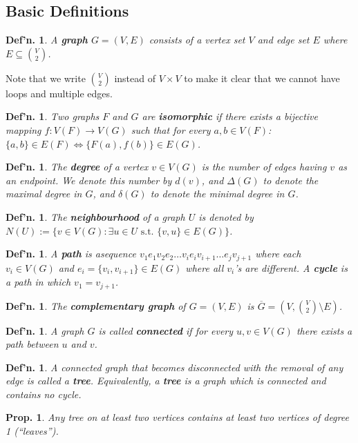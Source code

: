 \documentclass[12pt, a4paper]{book}
\newtheorem{definition}[theorem]{Def'n.}
\newtheorem{proposition}[theorem]{Prop.}
\theoremstyle{nonumberplain}
\begin{document}
\subsection{Basic Definitions}
\begin{definition}
    A \textbf{graph} $G=(V,E)$ consists of a vertex set $V$ and edge set $E$ where $E\subseteq\binom{V}{2}$.
\end{definition}
Note that we write $\binom{V}{2}$ instead of $V\times V$ to make it clear that we cannot have loops and multiple edges.
\begin{definition}
    Two graphs $F$ and $G$ are \textbf{isomorphic} if there exists a bijective mapping $f:V(F)\to V(G)$ such that for every $a,b\in V(F)$: $\{a,b\}\in E(F)\Leftrightarrow \{F(a),f(b)\}\in E(G)$.
\end{definition}
\begin{definition}
    The \textbf{degree} of a vertex $v\in V(G)$ is the number of edges having $v$ as an endpoint.
    We denote this number by $d(v)$, and $\Delta(G)$ to denote the maximal degree in $G$, and $\delta(G)$ to denote the minimal degree in $G$.
\end{definition}
\begin{definition}
    The \textbf{neighbourhood} of a graph $U$ is denoted by $N(U):=\{v\in V(G):\exists u\in U\text{ s.t. }\{v,u\}\in E(G)\}$.
\end{definition}
\begin{definition}
    A \textbf{path} is asequence $v_1e_1v_2e_2\ldots v_ie_iv_{i+1}\ldots e_jv_{j+1}$ where each $v_i\in V(G)$ and $e_i=\{v_i,v_{i+1}\}\in E(G)$ where all $v_i$'s are different.
    A \textbf{cycle} is a path in which $v_1=v_{j+1}$.
\end{definition}
\begin{definition}
    The \textbf{complementary graph} of $G=(V,E)$ is $\overline{G}=\left(V,\binom{V}{2}\setminus E\right)$.
\end{definition}
\begin{definition}
    A graph $G$ is called \textbf{connected} if for every $u,v\in V(G)$ there exists a path between $u$ and $v$.
\end{definition}
\begin{definition}
    A connected graph that becomes disconnected with the removal of any edge is called a \textbf{tree}.
    Equivalently, a \textbf{tree} is a graph which is connected and contains no cycle.
\end{definition}
\begin{proposition}
    Any tree on at least two vertices contains at least two vertices of degree 1 (``leaves'').
\end{proposition}
\end{document}
